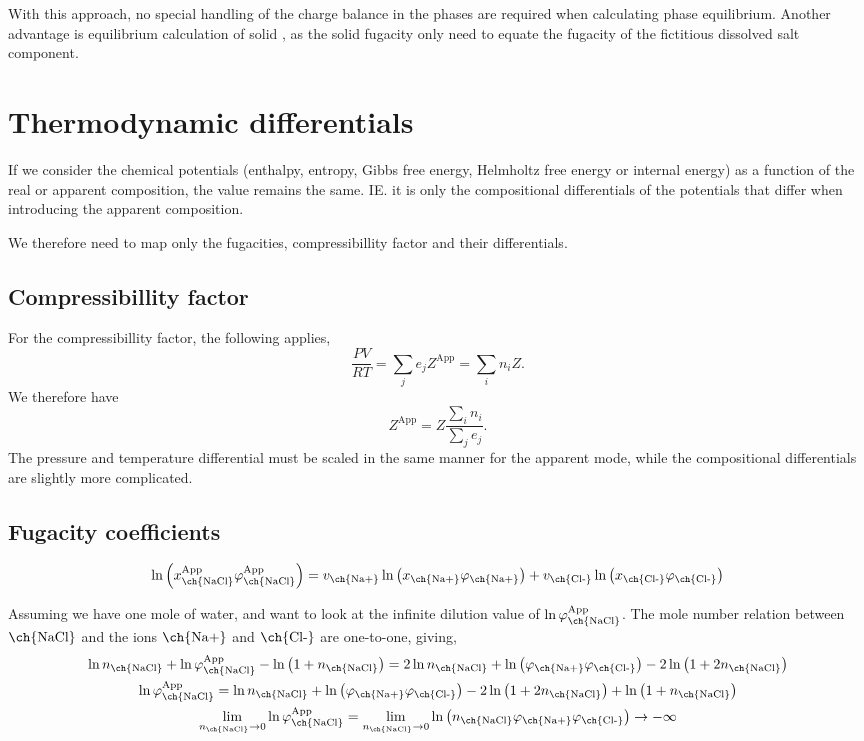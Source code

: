 \documentclass[internal,english]{sintefmemo2012}
\newcommand{\lp}{\ensuremath{\left(}\xspace}
\newcommand{\rp}{\ensuremath{\right)}\xspace}
\newcommand{\app}{\ensuremath{\text{App}}\xspace}
\newcommand{\nacl}{\ensuremath{\text{\ch{NaCl}}}\xspace}
\newcommand{\na}{\ensuremath{\text{\ch{Na+}}}\xspace}
\newcommand{\cl}{\ensuremath{\text{\ch{Cl-}}}\xspace}
\begin{document}
With this approach, no special handling of the charge balance in the
phases are required when calculating phase equilibrium. Another
advantage is equilibrium calculation of solid , as the
solid fugacity only need to equate the fugacity of the fictitious
dissolved salt component.

\section{Thermodynamic differentials}

If we consider the chemical potentials (enthalpy, entropy, Gibbs free
energy, Helmholtz free energy or internal energy) as a function of the
real or apparent composition, the value remains the same. IE. it is
only the compositional differentials of the potentials that differ
when introducing the apparent composition.

We therefore need to map only the fugacities, compressibillity factor
and their differentials.

\subsection{Compressibillity factor}
For the compressibillity factor, the following applies,
\begin{equation}
  \frac{PV}{RT} = \sum_j e_j Z^\app = \sum_i n_i Z.
  \label{eq:compressibillity_factor_relation}
\end{equation}
We therefore have
\begin{equation}
  Z^\app = Z \frac{\sum_i n_i}{\sum_j e_j }.
  \label{eq:compressibillity_factor}
\end{equation}
The pressure and temperature differential must be scaled in the same
manner for the apparent mode, while the compositional differentials
are slightly more complicated.

\subsection{Fugacity coefficients}
\begin{equation}
  \ln \lp x_\nacl^\app \varphi_\nacl^\app \rp  = v_\na \ln \lp x_\na \varphi_\na \rp + v_\cl \ln \lp x_\cl \varphi_\cl \rp
\label{eq:fugacity_coeff}
\end{equation}

Assuming we have one mole of water, and want to look at the infinite
dilution value of $\ln \varphi_\nacl^\app$. The mole number relation between \nacl and the ions \na and \cl are one-to-one, giving,
\begin{gather}
  \ln n_\nacl + \ln \varphi_\nacl^\app - \ln \lp 1 + n_\nacl \rp  = 2 \ln n_\nacl + \ln \lp\varphi_\na\varphi_\cl\rp - 2\ln \lp 1 + 2 n_\nacl \rp \nonumber \\
  \ln \varphi_\nacl^\app = \ln n_\nacl + \ln \lp\varphi_\na\varphi_\cl\rp - 2\ln \lp 1 + 2 n_\nacl \rp + \ln \lp 1 + n_\nacl \rp \nonumber \\
  \lim_{n_\nacl \rightarrow 0}\ln \varphi_\nacl^\app = \lim_{n_\nacl \rightarrow 0} \ln \lp n_\nacl \varphi_\na\varphi_\cl\rp \rightarrow - \infty
\label{eq:fugacity_coeff_inf}
\end{gather}
\end{document}
